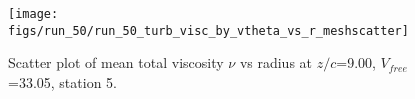 \begin{figure}[H]
\centering
\texttt{[image: figs/run\_50/run\_50\_turb\_visc\_by\_vtheta\_vs\_r\_meshscatter]}
\caption{Scatter plot of mean total viscosity $\nu$ vs radius at $z/c$=9.00, $V_{free}$=33.05, station 5.}
\label{fig:run_50_turb_visc_by_vtheta_vs_r_meshscatter}
\end{figure}


